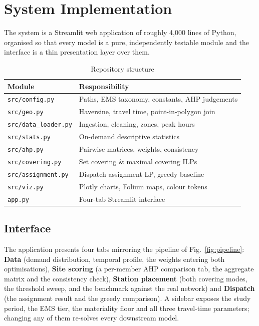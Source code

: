 \documentclass[conference]{IEEEtran}
\begin{document}
\section{System Implementation}

The system is a Streamlit web application of roughly 4{,}000 lines of Python,
organised so that every model is a pure, independently testable module and the
interface is a thin presentation layer over them.

\begin{table}[htbp]
\caption{Repository structure}
\label{tab:layout}
\centering
\small
\begin{tabular}{@{}p{}p{}@{}}
\toprule
\textbf{Module} & \textbf{Responsibility} \\
\midrule
\texttt{src/config.py} & Paths, EMS taxonomy, constants, AHP judgements \\
\texttt{src/geo.py} & Haversine, travel time, point-in-polygon join \\
\texttt{src/data\_loader.py} & Ingestion, cleaning, zones, peak hours \\
\texttt{src/stats.py} & On-demand descriptive statistics \\
\texttt{src/ahp.py} & Pairwise matrices, weights, consistency \\
\texttt{src/covering.py} & Set covering \& maximal covering ILPs \\
\texttt{src/assignment.py} & Dispatch assignment LP, greedy baseline \\
\texttt{src/viz.py} & Plotly charts, Folium maps, colour tokens \\
\texttt{app.py} & Four-tab Streamlit interface \\
\bottomrule
\end{tabular}
\end{table}

\subsection{Interface}

The application presents four tabs mirroring the pipeline of
Fig.~\ref{fig:pipeline}: \textbf{Data} (demand distribution, temporal profile,
the weights entering both optimisations), \textbf{Site scoring} (a per-member
AHP comparison tab, the aggregate matrix and the consistency check),
\textbf{Station placement} (both covering modes, the threshold sweep, and the
benchmark against the real network) and \textbf{Dispatch} (the assignment
result and the greedy comparison). A sidebar exposes the study period, the EMS
tier, the materiality floor and all three travel-time parameters; changing any
of them re-solves every downstream model.
\end{document}
